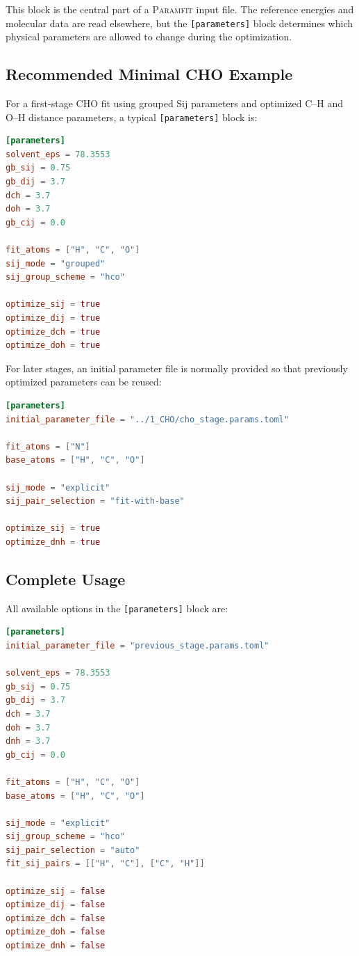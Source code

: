 \documentclass[11pt]{article}
\begin{document}
This block is the central part of a \textsc{Paramfit} input file. The reference
energies and molecular data are read elsewhere, but the \texttt{[parameters]}
block determines which physical parameters are allowed to change during the
optimization.

\subsection{Recommended Minimal CHO Example}

For a first-stage CHO fit using grouped Sij parameters and optimized C--H and
O--H distance parameters, a typical \texttt{[parameters]} block is:

\begin{lstlisting}[language=toml]
[parameters]
solvent_eps = 78.3553
gb_sij = 0.75
gb_dij = 3.7
dch = 3.7
doh = 3.7
gb_cij = 0.0

fit_atoms = ["H", "C", "O"]
sij_mode = "grouped"
sij_group_scheme = "hco"

optimize_sij = true
optimize_dij = true
optimize_dch = true
optimize_doh = true
\end{lstlisting}

For later stages, an initial parameter file is normally provided so that
previously optimized parameters can be reused:

\begin{lstlisting}[language=toml]
[parameters]
initial_parameter_file = "../1_CHO/cho_stage.params.toml"

fit_atoms = ["N"]
base_atoms = ["H", "C", "O"]

sij_mode = "explicit"
sij_pair_selection = "fit-with-base"

optimize_sij = true
optimize_dnh = true
\end{lstlisting}

\subsection{Complete Usage}

All available options in the \texttt{[parameters]} block are:

\begin{lstlisting}[language=toml]
[parameters]
initial_parameter_file = "previous_stage.params.toml"

solvent_eps = 78.3553
gb_sij = 0.75
gb_dij = 3.7
dch = 3.7
doh = 3.7
dnh = 3.7
gb_cij = 0.0

fit_atoms = ["H", "C", "O"]
base_atoms = ["H", "C", "O"]

sij_mode = "explicit"
sij_group_scheme = "hco"
sij_pair_selection = "auto"
fit_sij_pairs = [["H", "C"], ["C", "H"]]

optimize_sij = false
optimize_dij = false
optimize_dch = false
optimize_doh = false
optimize_dnh = false
\end{lstlisting}
\end{document}
